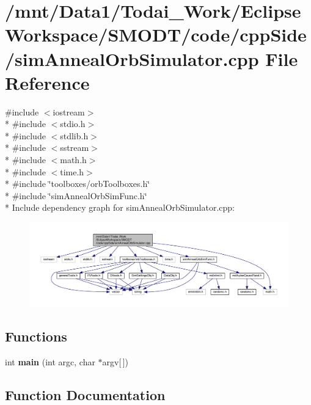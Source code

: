 \section{/mnt/\-Data1/\-Todai\-\_\-\-Work/\-Eclipse\-Workspace/\-S\-M\-O\-D\-T/code/cpp\-Side/sim\-Anneal\-Orb\-Simulator.cpp File Reference}
\label{sim_anneal_orb_simulator_8cpp}
{\ttfamily \#include $<$iostream$>$}\\*
{\ttfamily \#include $<$stdio.\-h$>$}\\*
{\ttfamily \#include $<$stdlib.\-h$>$}\\*
{\ttfamily \#include $<$sstream$>$}\\*
{\ttfamily \#include $<$math.\-h$>$}\\*
{\ttfamily \#include $<$time.\-h$>$}\\*
{\ttfamily \#include \char`\"{}toolboxes/orb\-Toolboxes.\-h\char`\"{}}\\*
{\ttfamily \#include \char`\"{}sim\-Anneal\-Orb\-Sim\-Func.\-h\char`\"{}}\\*
Include dependency graph for sim\-Anneal\-Orb\-Simulator.\-cpp\-:
\nopagebreak
\begin{figure}[H]
\begin{center}
\leavevmode
\includegraphics[width=350pt]{sim_anneal_orb_simulator_8cpp__incl}
\end{center}
\end{figure}
\subsection*{Functions}
\begin{DoxyCompactItemize}
\item 
int {\bf main} (int argc, char $\ast$argv[$\,$])
\end{DoxyCompactItemize}


\subsection{Function Documentation}
